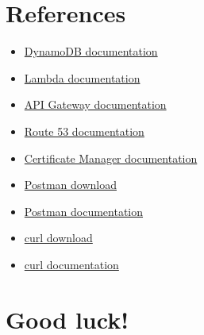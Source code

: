 \documentclass{article}
\begin{document}
\section{References}\label{references}
\begin{itemize}
\item \href{https://docs.aws.amazon.com/amazondynamodb/latest/developerguide/Introduction.html}{DynamoDB documentation}
\item \href{https://docs.aws.amazon.com/lambda/latest/dg/welcome.html}{Lambda documentation}
\item \href{https://docs.aws.amazon.com/apigateway/latest/developerguide/welcome.html}{API Gateway documentation}
\item \href{https://docs.aws.amazon.com/Route53/latest/DeveloperGuide/Welcome.html}{Route 53 documentation}
\item \href{https://docs.aws.amazon.com/acm/latest/userguide/acm-overview.html}{Certificate Manager documentation}
\item \href{https://www.postman.com/downloads/}{Postman download}
\item \href{https://learning.postman.com/docs/getting-started/introduction/}{Postman documentation}
\item \href{https://curl.se/download.html}{curl download}
\item \href{https://curl.se/docs/manual.html}{curl documentation}
\end{itemize}

\section*{Good luck!}
\end{document}
